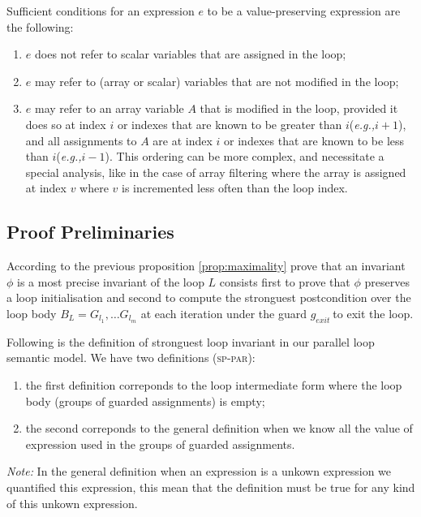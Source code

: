 \documentclass[a4paper,10pt]{article}
\newcommand{\eg}{\textit{e.g.,}\xspace}
\newcommand{\idx}{\ensuremath{i}\xspace}
\newcommand{\gexit}{\ensuremath{\mathit{g_{exit}~}}}
\newcommand{\patternnote}{\noindent\textit{Note:}\xspace}
\newcommand{\sppar}{\textsc{sp-par}\xspace}
\begin{document}
Sufficient conditions for an expression $e$ to be a value-preserving expression
are the following:
\begin{enumerate}
\item $e$ does not refer to scalar variables that are assigned in the loop;
\item $e$ may refer to (array or scalar) variables that are not modified in the loop;
\item $e$ may refer to an array variable $A$ that is modified in the loop,
  provided it does so at index \idx or indexes that are known to be greater
  than \idx (\eg $\idx + 1$), and all assignments to $A$ are at index \idx or
  indexes that are known to be less than \idx (\eg $\idx - 1$). This ordering
  can be more complex, and necessitate a special analysis, like in the case of
  array filtering where the array is assigned at index $v$ where $v$ is
  incremented less often than the loop index.
\end{enumerate}

\subsection{Proof Preliminaries}
\label{sec:proof-pre}

According to the previous proposition \ref{prop:maximality} prove that an invariant $\phi$ 
is a most precise invariant of the loop $L$ consists first to prove that $\phi$ preserves 
a loop initialisation and second to compute the stronguest postcondition over the loop body 
$B_L = G_{l_1}, \ldots G_{l_m}$ at each iteration under the guard \gexit to exit the loop.

\vspace{0.5 cm}
Following is the definition of stronguest loop invariant in our parallel loop semantic model.
We have two definitions (\sppar): 
\begin{enumerate}
 \item the first definition correponds to the loop intermediate form 
where the loop body (groups of guarded assignments) is empty;
 \item the second correponds to the general definition when we know 
all the value of expression used in the groups of guarded assignments. 
\end{enumerate}

\patternnote
In the general definition when an expression is a unkown expression we quantified 
this expression, this mean that the definition must be true for any kind of this unkown expression.
\end{document}
